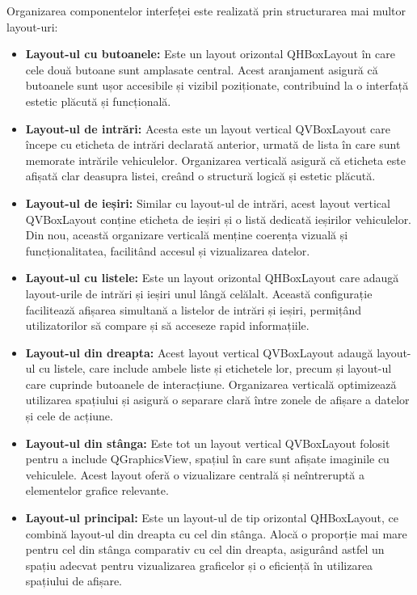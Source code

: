\documentclass[a4paper,12pt]{report}
\begin{document}
Organizarea componentelor interfeței este realizată prin structurarea mai multor layout-uri:

\begin{itemize}
    \item \textbf{Layout-ul cu butoanele:} Este un layout orizontal QHBoxLayout în care cele două butoane sunt amplasate central. Acest aranjament asigură că butoanele sunt ușor accesibile și vizibil poziționate, contribuind la o interfață estetic plăcută și funcțională.

    \item \textbf{Layout-ul de intrări:} Acesta este un layout vertical QVBoxLayout care începe cu eticheta de intrări declarată anterior, urmată de lista în care sunt memorate intrările vehiculelor. Organizarea verticală asigură că eticheta este afișată clar deasupra listei, creând o structură logică și estetic plăcută.

    \item \textbf{Layout-ul de ieșiri:} Similar cu layout-ul de intrări, acest layout vertical QVBoxLayout conține eticheta de ieșiri și o listă dedicată ieșirilor vehiculelor. Din nou, această organizare verticală menține coerența vizuală și funcționalitatea, facilitând accesul și vizualizarea datelor.

    \item \textbf{Layout-ul cu listele:} Este un layout orizontal QHBoxLayout care adaugă layout-urile de intrări și ieșiri unul lângă celălalt. Această configurație facilitează afișarea simultană a listelor de intrări și ieșiri, permițând utilizatorilor să compare și să acceseze rapid informațiile.

    \item \textbf{Layout-ul din dreapta:} Acest layout vertical QVBoxLayout adaugă layout-ul cu listele, care include ambele liste și etichetele lor, precum și layout-ul care cuprinde butoanele de interacțiune. Organizarea verticală optimizează utilizarea spațiului și asigură o separare clară între zonele de afișare a datelor și cele de acțiune.

    \item \textbf{Layout-ul din stânga:} Este tot un layout vertical QVBoxLayout folosit pentru a include QGraphicsView, spațiul în care sunt afișate imaginile cu vehiculele. Acest layout oferă o vizualizare centrală și neîntreruptă a elementelor grafice relevante.

    \item \textbf{Layout-ul principal:} Este un layout-ul de tip orizontal QHBoxLayout, ce combină layout-ul din dreapta cu cel din stânga. Alocă o proporție mai mare pentru cel din stânga comparativ cu cel din dreapta, asigurând astfel un spațiu adecvat pentru vizualizarea graficelor și o eficiență în utilizarea spațiului de afișare.
\end{itemize}
\end{document}
